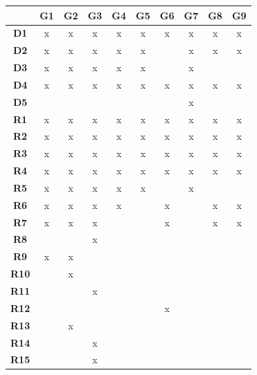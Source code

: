 \begin{table}[H]
    \centering
    \begin{tabular}{|c|c|c|c|c|c|c|c|c|c|}
        \hline &   
        \textbf{G1} & 
        \textbf{G2} & 
        \textbf{G3} & 
        \textbf{G4} & 
        \textbf{G5} & 
        \textbf{G6} & 
        \textbf{G7} & 
        \textbf{G8} & 
        \textbf{G9} \\ \hline
        \textbf{D1}  & x & x & x & x & x & x & x & x & x \\ \hline
        \textbf{D2}  & x & x & x & x & x &   & x & x & x \\ \hline
        \textbf{D3}  & x & x & x & x & x &   & x &   &   \\ \hline
        \textbf{D4}  & x & x & x & x & x & x & x & x & x \\ \hline
        \textbf{D5}  &   &   &   &   &   &   & x &   &   \\ \hline\hline
        \textbf{R1}  & x & x & x & x & x & x & x & x & x \\ \hline
        \textbf{R2}  & x & x & x & x & x & x & x & x & x \\ \hline
        \textbf{R3}  & x & x & x & x & x & x & x & x & x \\ \hline
        \textbf{R4}  & x & x & x & x & x & x & x & x & x \\ \hline
        \textbf{R5}  & x & x & x & x & x &   & x &   &   \\ \hline
        \textbf{R6}  & x & x & x & x &   & x &   & x & x \\ \hline
        \textbf{R7}  & x & x & x &   &   & x &   & x & x \\ \hline
        \textbf{R8}  &   &   & x &   &   &   &   &   &   \\ \hline
        \textbf{R9}  & x & x &   &   &   &   &   &   &   \\ \hline
        \textbf{R10} &   & x &   &   &   &   &   &   &   \\ \hline
        \textbf{R11} &   &   & x &   &   &   &   &   &   \\ \hline
        \textbf{R12} &   &   &   &   &   & x &   &   &   \\ \hline
        \textbf{R13} &   & x &   &   &   &   &   &   &   \\ \hline
        \textbf{R14} &   &   & x &   &   &   &   &   &   \\ \hline
        \textbf{R15} &   &   & x &   &   &   &   &   &   \\ \hline

\end{tabular}
\end{table}
